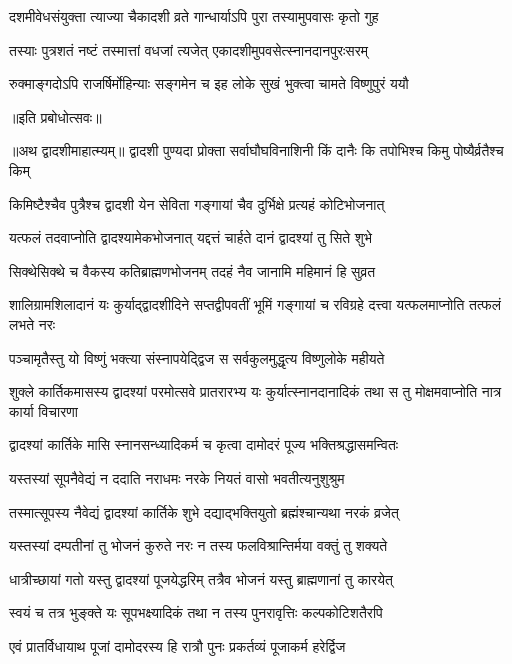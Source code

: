\twolineshloka
{दशमीवेधसंयुक्ता त्याज्या चैकादशी व्रते}
{गान्धार्याऽपि पुरा तस्यामुपवासः कृतो गुह} %

\twolineshloka
{तस्याः पुत्रशतं नष्टं तस्मात्तां वधजां त्यजेत्}
{एकादशीमुपवसेत्स्नानदानपुरःसरम्} %

\twolineshloka
{रुक्माङ्गदोऽपि राजर्षिर्मोहिन्याः सङ्गमेन च}
{इह लोके सुखं भुक्त्वा चामते विष्णुपुरं ययौ} %


॥इति प्रबोधोत्सवः॥

॥अथ द्वादशीमाहात्म्यम्॥
\twolineshloka
{द्वादशी पुण्यदा प्रोक्ता सर्वाघौघविनाशिनी}
{किं दानैः कि तपोभिश्च किमु पोष्यैर्व्रतैश्च किम्} %

\twolineshloka
{किमिष्टैश्चैव पुत्रैश्च द्वादशी येन सेविता}
{गङ्गायां चैव दुर्भिक्षे प्रत्यहं कोटिभोजनात्} %

\twolineshloka
{यत्फलं तदवाप्नोति द्वादश्यामेकभोजनात्}
{यद्दत्तं चार्हते दानं द्वादश्यां तु सिते शुभे} %

\twolineshloka
{सिक्थेसिक्थे च वैकस्य कतिब्राह्मणभोजनम्}
{तदहं नैव जानामि महिमानं हि सुव्रत} %

\threelineshloka
{शालिग्रामशिलादानं यः कुर्याद्द्वादशीदिने}
{सप्तद्वीपवतीं भूमिं गङ्गायां च रविग्रहे}
{दत्त्वा यत्फलमाप्नोति तत्फलं लभते नरः} %

\twolineshloka
{पञ्चामृतैस्तु यो विष्णुं भक्त्या संस्नापयेद्द्विज}
{स सर्वकुलमुद्धृत्य विष्णुलोके महीयते} %

\threelineshloka
{शुक्ले कार्तिकमासस्य द्वादश्यां परमोत्सवे}
{प्रातरारभ्य यः कुर्यात्स्नानदानादिकं तथा}
{स तु मोक्षमवाप्नोति नात्र कार्या विचारणा} %

\twolineshloka
{द्वादश्यां कार्तिके मासि स्नानसन्ध्यादिकर्म च}
{कृत्वा दामोदरं पूज्य भक्तिश्रद्धासमन्वितः} %

\twolineshloka
{यस्तस्यां सूपनैवेद्यं न ददाति नराधमः}
{नरके नियतं वासो भवतीत्यनुशुश्रुम} %

\twolineshloka
{तस्मात्सूपस्य नैवेद्यं द्वादश्यां कार्तिके शुभे}
{दद्याद्भक्तियुतो ब्रह्मंश्चान्यथा नरकं व्रजेत्} %

\twolineshloka
{यस्तस्यां दम्पतीनां तु भोजनं कुरुते नरः}
{न तस्य फलविश्रान्तिर्मया वक्तुं तु शक्यते} %

\twolineshloka
{धात्रीच्छायां गतो यस्तु द्वादश्यां पूजयेद्धरिम्}
{तत्रैव भोजनं यस्तु ब्राह्मणानां तु कारयेत्} %

\twolineshloka
{स्वयं च तत्र भुङ्क्ते यः सूपभक्ष्यादिकं तथा}
{न तस्य पुनरावृत्तिः कल्पकोटिशतैरपि} %

\twolineshloka
{एवं प्रातर्विधायाथ पूजां दामोदरस्य हि}
{रात्रौ पुनः प्रकर्तव्यं पूजाकर्म हरेर्द्विज} %

